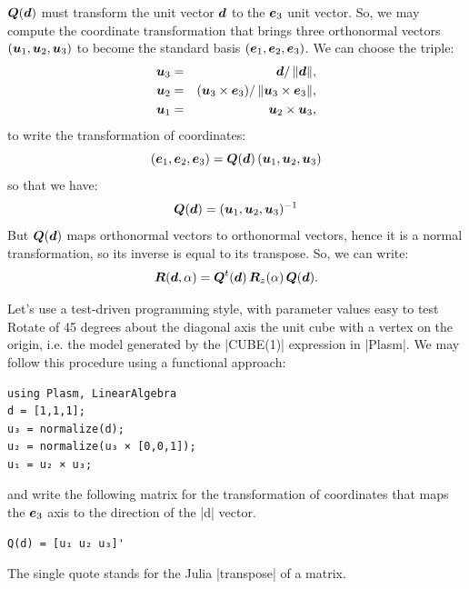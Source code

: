 ${\mbox{\boldmath $Q$}}({\mbox{\boldmath $d$}})$ must transform the unit vector ${\mbox{\boldmath $d$}}$ to the ${\mbox{\boldmath $e$}}_3$ unit vector. So, we may compute the coordinate transformation that brings three orthonormal vectors $({\mbox{\boldmath $u$}}_1, {\mbox{\boldmath $u$}}_2, {\mbox{\boldmath $u$}}_3)$ to become the standard basis $({\mbox{\boldmath $e$}}_1, {\mbox{\boldmath $e$}}_2, {\mbox{\boldmath $e$}}_3)$. We can choose the triple:
\begin{eqnarray}
{\mbox{\boldmath $u$}}_3 &=& {\mbox{\boldmath $d$}}/\,\|{\mbox{\boldmath $d$}}\|,\nonumber\\
{\mbox{\boldmath $u$}}_2 &=& ({\mbox{\boldmath $u$}}_3 \times {\mbox{\boldmath $e$}}_3)/\,\|{\mbox{\boldmath $u$}}_3 \times {\mbox{\boldmath $e$}}_3\|,\\
{\mbox{\boldmath $u$}}_1 &=& {\mbox{\boldmath $u$}}_2 \times {\mbox{\boldmath $u$}}_3,\nonumber
\end{eqnarray}
to write the transformation of coordinates:
\[
({\mbox{\boldmath $e$}}_1, {\mbox{\boldmath $e$}}_2, {\mbox{\boldmath $e$}}_3) = {\mbox{\boldmath $Q$}}({\mbox{\boldmath $d$}})\, ({\mbox{\boldmath $u$}}_1, {\mbox{\boldmath $u$}}_2, {\mbox{\boldmath $u$}}_3)
\]
so that we have:
\[
{\mbox{\boldmath $Q$}}({\mbox{\boldmath $d$}}) = ({\mbox{\boldmath $u$}}_1, {\mbox{\boldmath $u$}}_2, {\mbox{\boldmath $u$}}_3)^{-1}
\]
But ${\mbox{\boldmath $Q$}}({\mbox{\boldmath $d$}})$ maps orthonormal vectors to orthonormal vectors, hence it is a normal
transformation, so its inverse is equal to its transpose. So, we can write:
\begin{equation}
{\mbox{\boldmath $R$}}({\mbox{\boldmath $d$}},\alpha) = {\mbox{\boldmath $Q$}}^{t}({\mbox{\boldmath $d$}})\, {\mbox{\boldmath $R$}}_z(\alpha)\, {\mbox{\boldmath $Q$}}({\mbox{\boldmath $d$}}).
\end{equation}


\begin{coding}
Let’s use a test-driven programming style, with parameter values easy to test
Rotate of 45 degrees about the diagonal axis the unit cube with a vertex on the origin, i.e. the model generated by the |CUBE(1)| expression in |Plasm|. 
We may follow this procedure using a functional approach:

\begin{lstlisting}[language=JuliaLocal, style=julia, mathescape=true]
using Plasm, LinearAlgebra
d = [1,1,1];
u₃ = normalize(d);
u₂ = normalize(u₃ × [0,0,1]);
u₁ = u₂ × u₃;
\end{lstlisting}
and write the following matrix for the transformation of coordinates that maps the ${\mbox{\boldmath $e$}}_3$ axis to the direction of the |d| vector. 
\begin{lstlisting}[language=JuliaLocal, style=julia, mathescape=true]
Q(d) = [u₁ u₂ u₃]'
\end{lstlisting}
The single quote stands for the Julia |transpose| of a matrix.
\end{coding}


